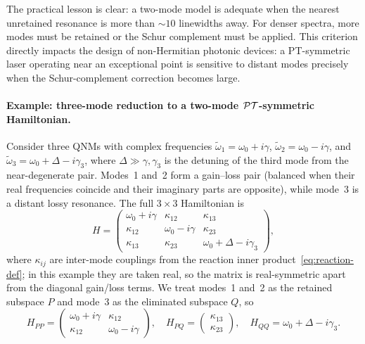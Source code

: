 The practical lesson is clear: a two-mode model is adequate when the
nearest unretained resonance is more than $\sim 10$ linewidths away.
For denser spectra, more modes must be retained or the Schur complement
must be applied. This criterion directly impacts the design of
non-Hermitian photonic devices: a PT-symmetric laser operating near
an exceptional point is sensitive to distant modes precisely when the
Schur-complement correction becomes large.

\paragraph{Example: three-mode reduction to a two-mode
$\mathcal{PT}$-symmetric Hamiltonian.}
Consider three QNMs with complex frequencies
$\tilde{\omega}_1 = \omega_0 + i\gamma$,
$\tilde{\omega}_2 = \omega_0 - i\gamma$, and
$\tilde{\omega}_3 = \omega_0 + \Delta - i\gamma_3$, where
$\Delta \gg \gamma, \gamma_3$ is the detuning of the third mode from the
near-degenerate pair. Modes~1 and~2 form a gain--loss pair (balanced
when their real frequencies coincide and their imaginary parts are
opposite), while mode~3 is a distant lossy resonance. The
full $3\times 3$ Hamiltonian is
\begin{equation}
 H = \begin{pmatrix}
 \omega_0 + i\gamma & \kappa_{12} & \kappa_{13} \\
 \kappa_{12} & \omega_0 - i\gamma & \kappa_{23} \\
 \kappa_{13} & \kappa_{23} & \omega_0 + \Delta - i\gamma_3
 \end{pmatrix},
 \label{eq:three-mode-full}
\end{equation}
where $\kappa_{ij}$ are inter-mode couplings from the reaction inner
product~\eqref{eq:reaction-def}; in this example they are taken real,
so the matrix is real-symmetric apart from the diagonal gain/loss
terms.  We treat modes~1 and~2 as the
retained subspace $P$ and mode~3 as the eliminated subspace $Q$, so
\begin{equation}
 H_{PP} = \begin{pmatrix}
 \omega_0 + i\gamma & \kappa_{12} \\
 \kappa_{12} & \omega_0 - i\gamma
 \end{pmatrix}, \quad
 H_{PQ} = \begin{pmatrix} \kappa_{13} \\ \kappa_{23} \end{pmatrix},
 \quad H_{QQ} = \omega_0 + \Delta - i\gamma_3.
 \label{eq:three-mode-partition}
\end{equation}
